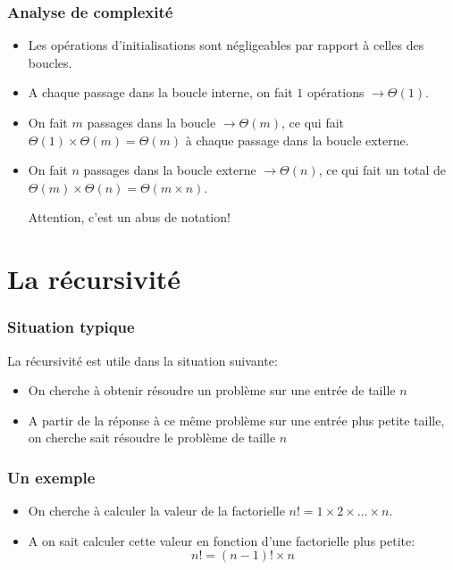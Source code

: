 \documentclass[aspectratio=169]{beamer}
\begin{document}
\begin{frame}
  \frametitle{Analyse de complexité}
  \begin{itemize}
  \item<+-> Les opérations d'initialisations sont négligeables par rapport à
    celles des boucles.

  \item<+-> A chaque passage dans la boucle interne, on fait \(1\) opérations
    \(\to \Theta(1)\).

  \item<+-> On fait \(m\) passages dans la boucle \(\to \Theta(m)\), ce qui fait
    \(\Theta(1)\times \Theta(m) = \Theta(m)\) à chaque passage dans la boucle
    externe.

  \item<+-> On fait \(n\) passages dans la boucle externe \(\to \Theta(n)\), ce
    qui fait un total de \(\Theta(m)\times \Theta(n) = \Theta(m\times n).\)

    \alert{Attention, c'est un abus de notation!}
  \end{itemize}
\end{frame}

\section{La récursivité}

\begin{frame}
  \frametitle{Situation typique}

  La récursivité est utile dans la situation suivante:

  \begin{itemize}
  \item On cherche à obtenir résoudre un problème sur une entrée de taille \(n\)
  \item A partir de la réponse à ce même problème sur une entrée plus petite taille, on
    cherche sait résoudre le problème de taille \(n\)
  \end{itemize}

\end{frame}

\begin{frame}
  \frametitle{Un exemple}

  \begin{itemize}
  \item On cherche à calculer la valeur de la factorielle \(n! = 1\times 2\times
    \ldots \times n.\)
  \item A on sait calculer cette valeur en fonction d'une factorielle plus petite:
    \[
      n! = (n-1)! \times n
    \]
  \end{itemize}

\end{frame}
\end{document}
